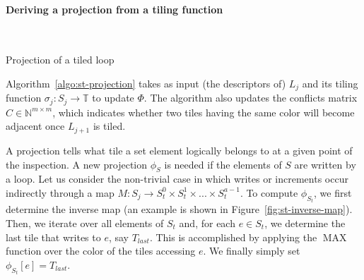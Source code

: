 \paragraph{Deriving a projection from a tiling function}

\begin{algorithm}[htp]

\nonl ~\\
\caption{Projection of a tiled loop}
\label{algo:st-projection}
\end{algorithm}

Algorithm~\ref{algo:st-projection} takes as input (the descriptors of) $L_{j}$ and its tiling function $\sigma_{j} :S_j \rightarrow \mathbb{T}$ to update $\Phi$. The algorithm also updates the conflicts matrix $C \in \mathbb{N}^{m \times m}$, which indicates whether two tiles having the same color will become adjacent once $L_{j+1}$ is tiled. 

A projection tells what tile a set element logically belongs to at a given point of the inspection. A new projection $\phi_{S}$ is needed if the elements of $S$ are written by a loop. Let us consider the non-trivial case in which writes or increments occur indirectly through a map $M : S_j \rightarrow S_t^0 \times S_t^1 \times ... \times S_t^{a-1}$. To compute $\phi_{S_{t}}$, we first determine the inverse map (an example is shown in Figure~\ref{fig:st-inverse-map}). Then, we iterate over all elements of $S_t$ and, for each $e \in S_t$, we determine the last tile that writes to $e$, say $T_{last}$. This is accomplished by applying the $\operatorname{MAX}$ function over the color of the tiles accessing $e$. We finally simply set $\phi_{S_{t}}[e] = T_{last}$. 


